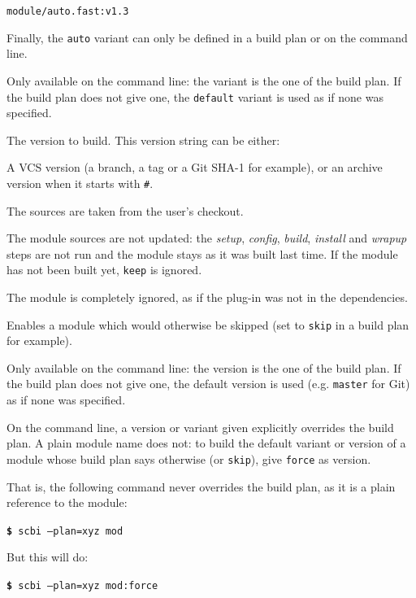\documentclass[a4paper,12pt,twoside]{article}
\newcommand{\code}[1]{\texttt{#1}}
\renewcommand{\emph}[1]{\textit{#1}}
\newcommand{\cmd}[1]{\tabto{1cm}\hspace{0.5cm}\texttt{\textbf{\$} #1}}
\begin{document}
\begin{description}[style=nextline]
\begin{description}[font=\texttt]
		\code{module/auto.fast:v1.3}

		Finally, the \code{auto} variant can only be defined in a build plan or on the command line.

		\item[@] Only available on the command line: the variant is the one of the build plan. If the build plan does not give one, the \code{default} variant is used as if none was specified.
	\end{description}

	\item[version] The version to build. This version string can be either:

	\begin{description}[font=\texttt]
		\item[<ID>] A VCS version (a branch, a tag or a Git SHA-1 for example), or an archive version when it starts with \code{\#}.
		\item[dev] The sources are taken from the user's checkout.
		\item[keep] The module sources are not updated: the \emph{setup}, \emph{config}, \emph{build}, \emph{install} and \emph{wrapup} steps are not run and the module stays as it was built last time. If the module has not been built yet, \code{keep} is ignored.
		\item[skip] The module is completely ignored, as if the plug-in was not in the dependencies.
		\item[force] Enables a module which would otherwise be skipped (set to \code{skip} in a build plan for example).
		\item[@] Only available on the command line: the version is the one of the build plan. If the build plan does not give one, the default version is used (e.g. \code{master} for Git) as if none was specified.
	\end{description}

	On the command line, a version or variant given explicitly overrides the build plan. A plain module name does not: to build the default variant or version of a module whose build plan says otherwise (or \code{skip}), give \code{force} as version.

	That is, the following command never overrides the build plan, as it is a plain reference to the module:

	\cmd{scbi --plan=xyz mod}

	But this will do:

	\cmd{scbi --plan=xyz mod:force}
\end{description}
\end{document}
